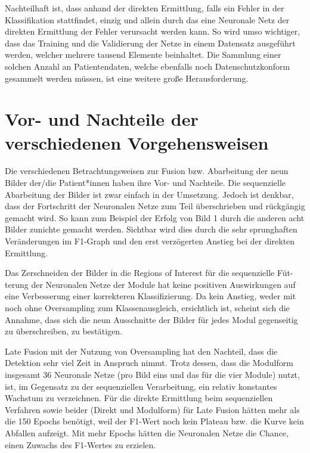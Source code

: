 Nachteilhaft ist, dass anhand der direkten Ermittlung, falls ein Fehler in der Klassifikation stattfindet, einzig und allein durch das eine Neuronale Netz der direkten Ermittlung der Fehler verursacht werden kann. So wird umso wichtiger, dass das Training und die Validierung der Netze in einem Datensatz ausgeführt werden, welcher mehrere tausend Elemente beinhaltet. Die Sammlung einer solchen Anzahl an Patientendaten, welche ebenfalls noch Datenschutzkonform gesammelt werden müssen, ist eine weitere große Herausforderung.


\clearpage
\section{Vor- und Nachteile der verschiedenen Vorgehensweisen}\label{early_vs_late}
Die verschiedenen Betrachtungsweisen zur Fusion bzw. Abarbeitung der neun Bilder der/die Patient*innen haben ihre Vor- und Nachteile. Die sequenzielle Abarbeitung der Bilder ist zwar einfach in der Umsetzung. Jedoch ist denkbar, dass der Fortschritt der Neuronalen Netze zum Teil überschrieben und rückgängig gemacht wird. So kann zum Beispiel der Erfolg von Bild 1 durch die anderen acht Bilder zunichte gemacht werden. Sichtbar wird dies durch die sehr sprunghaften Veränderungen im F1-Graph und den erst verzögerten Anstieg bei der direkten Ermittlung.

Das Zerschneiden der Bilder in die Regions of Interest für die sequenzielle Füt- terung der Neuronalen Netze der Module hat keine positiven Auswirkungen auf eine Verbesserung einer korrekteren Klassifizierung. Da kein Anstieg, weder mit noch ohne Oversampling zum Klassenausgleich, ersichtlich ist, scheint sich die Annahme, dass sich die neun Ausschnitte der Bilder für jedes Modul gegenseitig zu überschreiben, zu bestätigen.

Late Fusion mit der Nutzung von Oversampling hat den Nachteil, dass die Detektion sehr viel Zeit in Anspruch nimmt. Trotz dessen, dass die Modulform insgesamt 36 Neuronale Netze (pro Bild eins und das für die vier Module) nutzt, ist, im Gegensatz zu der sequenziellen Verarbeitung, ein relativ konstantes Wachstum zu verzeichnen. Für die direkte Ermittlung beim sequenziellen Verfahren sowie beider (Direkt und Modulform) für Late Fusion hätten mehr als die 150 Epochs benötigt, weil der F1-Wert noch kein Plateau bzw. die Kurve kein Abfallen aufzeigt. Mit mehr Epochs hätten die Neuronalen Netze die Chance, einen Zuwachs des F1-Wertes zu erzielen.

